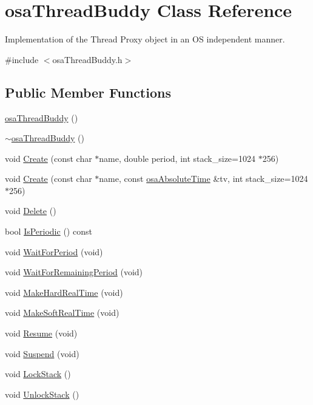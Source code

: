 \hypertarget{classosa_thread_buddy}{}\section{osa\+Thread\+Buddy Class Reference}
\label{classosa_thread_buddy}


Implementation of the Thread Proxy object in an O\+S independent manner.  




{\ttfamily \#include $<$osa\+Thread\+Buddy.\+h$>$}

\subsection*{Public Member Functions}
\begin{DoxyCompactItemize}
\item 
\hyperlink{classosa_thread_buddy_a334d30a95ac595ef84fb35d69dc706a1}{osa\+Thread\+Buddy} ()
\item 
\hyperlink{classosa_thread_buddy_ace67a6e57c40840449f4c65931d947ee}{$\sim$osa\+Thread\+Buddy} ()
\item 
void \hyperlink{classosa_thread_buddy_a15cdc68a68ba0555bd970b9f787f3129}{Create} (const char $\ast$name, double period, int stack\+\_\+size=1024 $\ast$256)
\item 
void \hyperlink{classosa_thread_buddy_ab7801bfa4574a2420a990b409e2b3be0}{Create} (const char $\ast$name, const \hyperlink{structosa_absolute_time}{osa\+Absolute\+Time} \&tv, int stack\+\_\+size=1024 $\ast$256)
\item 
void \hyperlink{classosa_thread_buddy_af3d06bec58fa682a95e05cf6e632507e}{Delete} ()
\item 
bool \hyperlink{classosa_thread_buddy_a7ebd43f0391370586abeb598e69e80f6}{Is\+Periodic} () const 
\item 
void \hyperlink{classosa_thread_buddy_ab6f53e0d21b9dd672f4d6bde5d608b1e}{Wait\+For\+Period} (void)
\item 
void \hyperlink{classosa_thread_buddy_aba8ca36b6029b10a13a8fe436c832658}{Wait\+For\+Remaining\+Period} (void)
\item 
void \hyperlink{classosa_thread_buddy_aea7ffe95f0837d4beedaa2037a4ff153}{Make\+Hard\+Real\+Time} (void)
\item 
void \hyperlink{classosa_thread_buddy_aedee30367d430fb9e6333c2373ab00f3}{Make\+Soft\+Real\+Time} (void)
\item 
void \hyperlink{classosa_thread_buddy_a9706080a6c83380927b36a31a70f2cc5}{Resume} (void)
\item 
void \hyperlink{classosa_thread_buddy_a01c2a24bcf816db413af39f980c44efc}{Suspend} (void)
\item 
void \hyperlink{classosa_thread_buddy_a31d77d59d74b0f1cfe5a060435c8e469}{Lock\+Stack} ()
\item 
void \hyperlink{classosa_thread_buddy_af0a5bed1d246b660b80af3fd3b90ad1b}{Unlock\+Stack} ()
\end{DoxyCompactItemize}


